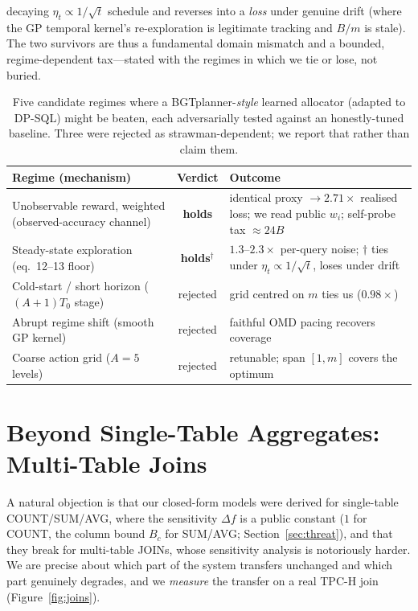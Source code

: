\documentclass[sigconf,nonacm]{acmart}
\begin{document}
decaying $\eta_t\propto1/\sqrt t$ schedule and reverses into a \emph{loss} under genuine drift (where the GP temporal kernel's re-exploration is legitimate tracking and $B/m$ is stale). The two survivors are thus a fundamental domain mismatch and a bounded, regime-dependent tax---stated with the regimes in which we tie or lose, not buried.

\begin{table}[h]
\footnotesize
\centering
\caption{Five candidate regimes where a BGTplanner-\emph{style} learned allocator (adapted to DP-SQL) might be beaten, each adversarially tested against an honestly-tuned baseline. Three were rejected as strawman-dependent; we report that rather than claim them.}
\label{tab:bgtfail}
\begin{tabular}{l|c|p{}}
\toprule
Regime (mechanism) & Verdict & Outcome \\
\midrule
Unobservable reward, weighted (observed-accuracy channel) & \textbf{holds} & identical proxy $\to 2.71\times$ realised loss; we read public $w_i$; self-probe tax ${\approx}24B$ \\
Steady-state exploration (eq.~12--13 floor) & \textbf{holds$^\dagger$} & $1.3$--$2.3\times$ per-query noise; $\dagger$ ties under $\eta_t{\propto}1/\sqrt t$, loses under drift \\
\midrule
Cold-start / short horizon ($(A{+}1)T_0$ stage) & rejected & grid centred on $m$ ties us ($0.98\times$) \\
Abrupt regime shift (smooth GP kernel) & rejected & faithful OMD pacing recovers coverage \\
Coarse action grid ($A{=}5$ levels) & rejected & retunable; span $[1,m]$ covers the optimum \\
\bottomrule
\end{tabular}
\end{table}

\section{Beyond Single-Table Aggregates: Multi-Table Joins}
\label{sec:joins}

A natural objection is that our closed-form models were derived for single-table COUNT/SUM/AVG, where the sensitivity $\Delta f$ is a public constant ($1$ for COUNT, the column bound $B_c$ for SUM/AVG; Section~\ref{sec:threat}), and that they break for multi-table JOINs, whose sensitivity analysis is notoriously harder. We are precise about which part of the system transfers unchanged and which part genuinely degrades, and we \emph{measure} the transfer on a real TPC-H join (Figure~\ref{fig:joins}).
\end{document}

